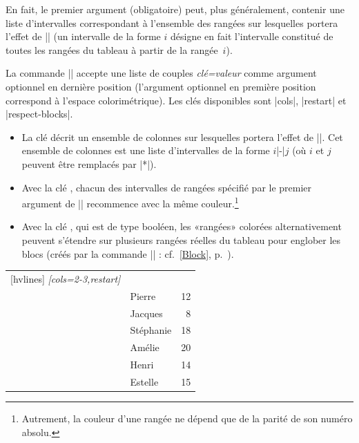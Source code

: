 \documentclass[dvipsnames]{article}
\begin{document}
\begin{itemize}[beginpenalty=10000]
En fait, le premier argument (obligatoire) peut, plus généralement, contenir
une liste d'intervalles correspondant à l'ensemble des rangées sur lesquelles
portera l'effet de |\rowcolors| (un intervalle de la forme $i$ désigne en fait
l'intervalle constitué de toutes les rangées du tableau à partir de la rangée~$i$).


\medbreak
La commande |\rowcolors| accepte une liste de couples
\textsl{clé=valeur} comme argument optionnel en dernière position (l'argument
optionnel en première position correspond à l'espace colorimétrique). Les clés
disponibles sont |cols|, |restart| et |respect-blocks|.
\begin{itemize}
\item La clé  décrit un ensemble de colonnes sur lesquelles
portera l'effet de |\rowcolors|. Cet ensemble de colonnes est une liste
d'intervalles de la forme $i$|-|$j$ (où $i$ et $j$ peuvent être remplacés par
|*|).

\item Avec la clé , chacun des intervalles de rangées
spécifié par le premier argument de |\rowcolors| recommence avec la même
couleur.\footnote{Autrement, la couleur d'une rangée ne dépend que de la parité
  de son numéro absolu.}

\item Avec la clé , qui est de type booléen, les
«rangées» colorées alternativement peuvent s'étendre sur plusieurs rangées
réelles du tableau pour englober les blocs (créés par la commande |\Block| :
cf.~\ref{Block}, p.~\pageref{Block}).
\end{itemize}

\medskip
\begin{Code}[width=10cm,show-output,no-cell-nodes]
\begin{NiceTabular}{clr}[hvlines]
\CodeBefore
  \emph{[cols=2-3,restart]}
\Body
   \\
  & Pierre & 12 \\
                & Jacques & 8 \\
  & Stéphanie & 18 \\
                & Amélie & 20 \\
                & Henri & 14 \\
                & Estelle & 15
\end{NiceTabular}
\end{Code}




\end{itemize}
\end{document}
